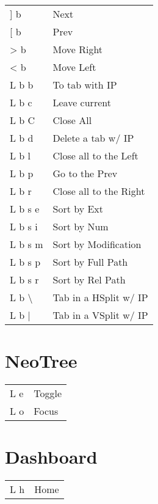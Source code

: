 \documentclass[
  ,landscape
  ,columns=4
]{cheatsheet}
\begin{document}
\begin{tabular}{ll}
	{]} b              & Next                   \\
	{[} b              & Prev                   \\
	> b                & Move Right             \\
	< b                & Move Left              \\
	L b b              & To tab with IP         \\
	L b c              & Leave current          \\
	L b C              & Close All              \\
	L b d              & Delete a tab w/ IP     \\
	L b l              & Close all to the Left  \\
	L b p              & Go to the Prev         \\
	L b r              & Close all to the Right \\
	L b s e            & Sort by Ext            \\
	L b s i            & Sort by Num            \\
	L b s m            & Sort by Modification   \\
	L b s p            & Sort by Full Path      \\
	L b s r            & Sort by Rel Path       \\
	L b \textbackslash & Tab in a HSplit w/ IP  \\
	L b {|}            & Tab in a VSplit w/ IP  \\
\end{tabular}

\section{NeoTree}

\begin{tabular}{ll}
	L e & Toggle \\
	L o & Focus  \\
\end{tabular}

\section{Dashboard}

\begin{tabular}{ll}
	L h & Home \\
\end{tabular}
\end{document}
